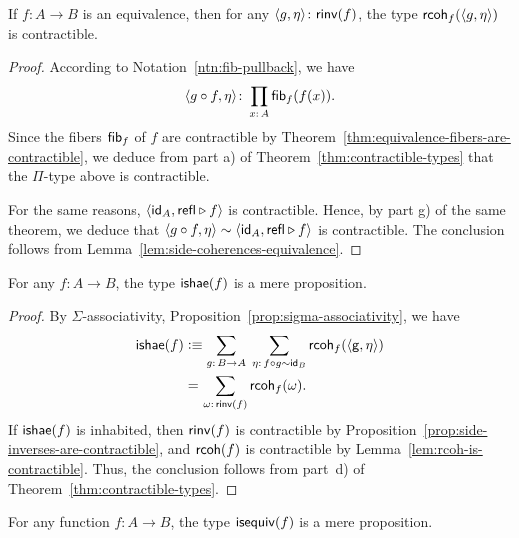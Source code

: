 \begin{lem}\fe\label{lem:rcoh-is-contractible}
    If\/ $f\colon A\to B$ is an equivalence, then for any\/ $\dep{g,\eta}\colon\fun{rinv}(f)$, the type\/ $\mathsf{rcoh}_f(\langle g,\eta\rangle)$ is contractible.
\end{lem}

\begin{proof}
    According to Notation~\ref{ntn:fib-pullback}, we have
    \[
        \dep{g\circ f,\eta}\colon
            \prod_{x\colon A}\fun{fib}_f(f(x)).
    \]
    Since the fibers $\mathsf{fib}_f$ of $f$ are contractible by Theorem~\ref{thm:equivalence-fibers-are-contractible}, we deduce from part a) of Theorem~\ref{thm:contractible-types} that the $\Pi$-type above is contractible.

    For the same reasons, $\langle\mathsf{id}_A,\mathsf{refl}\triangleright f\rangle$ is contractible. Hence, by part g) of the same theorem, we deduce that $\langle g\circ f,\eta\rangle\sim\langle\mathsf{id}_A,\mathsf{refl}\triangleright f\rangle$ is contractible. The conclusion follows from Lemma~\ref{lem:side-coherences-equivalence}.
\end{proof}

\begin{thm}\fe\label{thm:ishae-is-mere-proposition}
    For any\/ $f\colon A\to B$, the type\/ $\mathsf{ishae}(f)$ is a mere proposition.
\end{thm}

\begin{proof}
    By $\Sigma$-associativity, Proposition~\ref{prop:sigma-associativity}, we have
    \begin{align*}
        \fun{ishae}(f)
            &\defeq
                \sum_{g\colon B\to A}\;
                \sum_{\eta\colon f\circ g\sim\id_B}
                    \fun{rcoh}_f(\dep{\fun{g,\eta}})\\
            &\eq{}
                \sum_{\omega\colon\fun{rinv}(f)}\fun{rcoh}_f(\omega).
    \end{align*}
    If $\mathsf{ishae}(f)$ is inhabited, then $\mathsf{rinv}(f)$ is contractible by Proposition~\ref{prop:side-inverses-are-contractible}, and $\mathsf{rcoh}(f)$ is contractible by Lemma~\ref{lem:rcoh-is-contractible}. Thus, the conclusion follows from part~d) of Theorem~\ref{thm:contractible-types}.
\end{proof}

\begin{cor}\label{cor:isequiv-is-mere-proposition}
    For any function\/ $f\colon A\to B$, the type\/ $\mathsf{isequiv}(f)$ is a mere proposition.
\end{cor}

